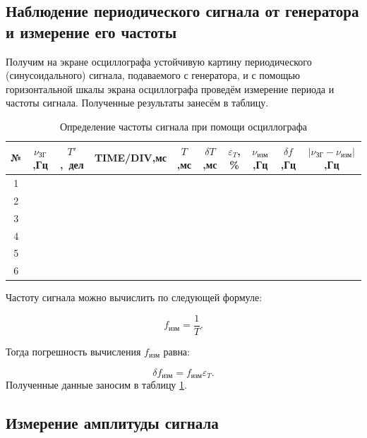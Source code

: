 \documentclass[a4paper,12pt]{article} %
\begin{document}
	\subsection{Наблюдение периодического сигнала от генератора и измерение его частоты}
	
	Получим на экране осциллографа устойчивую картину периодического (синусоидального) сигнала, подаваемого с генератора, и с помощью горизонтальной шкалы экрана осциллографа проведём измерение периода и частоты сигнала. Полученные результаты занесём в таблицу.
	
	\begin{table}[H]
		\centering
		\caption{Определение частоты сигнала при помощи осциллографа}
		\begin{tabular}{|c|c|c|c|c|c|c|c|c|c|}
			\hline
			№ & $ \nu_\text{ЗГ} $,Гц & $ T' $,~дел & TIME/DIV,мс & $ T $,мс & $ \delta T $,мс & $ \varepsilon_T $, \% & $ \nu_\text{изм} $,Гц & $ \delta f $,Гц & $ \left| \nu_\text{ЗГ} - \nu_\text{изм} \right| $,Гц \\ \hline
			1 &  &  &  &  &  &  &  &  &  \\ \hline
			2 &  &  &  &  &  &  &  &  &  \\ \hline
			3 &  &  &  &  &  &  &  &  &  \\ \hline
			4 &  &  &  &  &  &  &  &  &  \\ \hline
			5 &  &  &  &  &  &  &  &  &  \\ \hline
			6 &  &  &  &  &  &  &  &  &  \\ \hline
		\end{tabular}
		\label{tab:chastota}
	\end{table}
	
	
	Частоту сигнала можно вычислить по следующей формуле:
	
	\begin{equation}
		f_\text{изм} = \frac{1}{T}.
	\end{equation}
	
	Тогда погрешность вычисления $ f_\text{изм} $ равна:
	
	\begin{equation}
		\delta f_\text{изм} = f_\text{изм}\varepsilon_T.
	\end{equation}
	Полученные данные заносим в таблицу \ref{tab:chastota}.
	
	\subsection{Измерение амплитуды сигнала}
	
\end{document}
